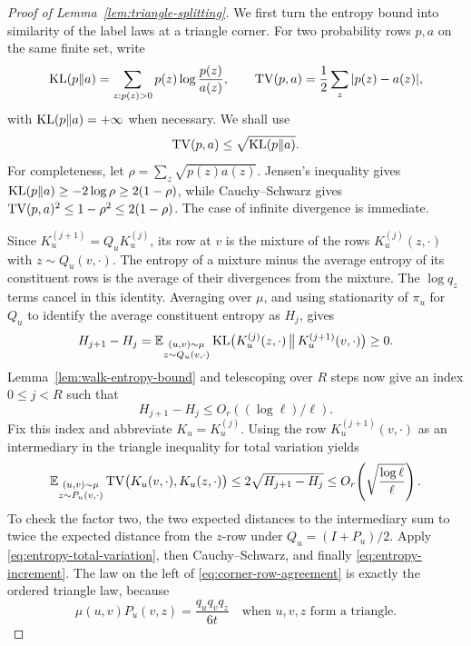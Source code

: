 \begin{proof}[Proof of Lemma~\ref{lem:triangle-splitting}]
We first turn the entropy bound into similarity of the label laws at a
triangle corner.  For two probability rows $p,a$ on the same finite set,
write
\[
 \operatorname{KL}(p\|a)=\sum_{z:p(z)>0}p(z)\log\frac{p(z)}{a(z)},\qquad
 \operatorname{TV}(p,a)=\frac12\sum_z|p(z)-a(z)|,
\]
with $\operatorname{KL}(p\|a)=+\infty$ when necessary.  We shall use
\begin{equation}
 \operatorname{TV}(p,a)\le\sqrt{\operatorname{KL}(p\|a)}.
 \label{eq:entropy-total-variation}
\end{equation}
For completeness, let $\rho=\sum_z\sqrt{p(z)a(z)}$.  Jensen's
inequality gives $\operatorname{KL}(p\|a)\ge-2\log\rho\ge2(1-\rho)$, while
Cauchy--Schwarz gives $\operatorname{TV}(p,a)^2\le1-\rho^2\le2(1-\rho)$.
The case of infinite divergence is immediate.

Since $K_u^{(j+1)}=Q_uK_u^{(j)}$, its row at $v$ is the mixture of
the rows $K_u^{(j)}(z,\cdot)$ with $z\sim Q_u(v,\cdot)$.  The entropy
of a mixture minus the average entropy of its constituent rows is the
average of their divergences from the mixture.  The $\log q_z$ terms
cancel in this identity.  Averaging over $\mu$, and using stationarity
of $\pi_u$ for $Q_u$ to identify the average constituent entropy as
$H_j$, gives
\begin{equation}
 H_{j+1}-H_j
 =\mathbb E_{\substack{(u,v)\sim\mu\\z\sim Q_u(v,\cdot)}}
   \operatorname{KL}\bigl(K_u^{(j)}(z,\cdot)\,
             \big\|\,K_u^{(j+1)}(v,\cdot)\bigr)\ge0.
 \label{eq:entropy-increment}
\end{equation}
Lemma~\ref{lem:walk-entropy-bound} and telescoping over $R$ steps now
give an index $0\le j<R$ such that
\[
 H_{j+1}-H_j\le O_r((\log\ell)/\ell).
\]
Fix this index and abbreviate $K_u=K_u^{(j)}$.  Using the row
$K_u^{(j+1)}(v,\cdot)$ as an intermediary in the triangle inequality
for total variation yields
\begin{equation}
 \mathbb E_{\substack{(u,v)\sim\mu\\z\sim P_u(v,\cdot)}}
       \operatorname{TV}\bigl(K_u(v,\cdot),K_u(z,\cdot)\bigr)
 \le2\sqrt{H_{j+1}-H_j}
 \le O_r\!\left(\sqrt{\frac{\log\ell}{\ell}}\right).
 \label{eq:corner-row-agreement}
\end{equation}
To check the factor two, the two expected distances to the intermediary
sum to twice the expected distance from the $z$-row under
$Q_u=(I+P_u)/2$.  Apply \eqref{eq:entropy-total-variation}, then
Cauchy--Schwarz, and finally \eqref{eq:entropy-increment}.  The law on
the left of \eqref{eq:corner-row-agreement} is exactly the ordered
triangle law, because
\[
 \mu(u,v)P_u(v,z)=\frac{q_uq_vq_z}{6t}
 \quad\text{when $u,v,z$ form a triangle}.
\]


\end{proof}

